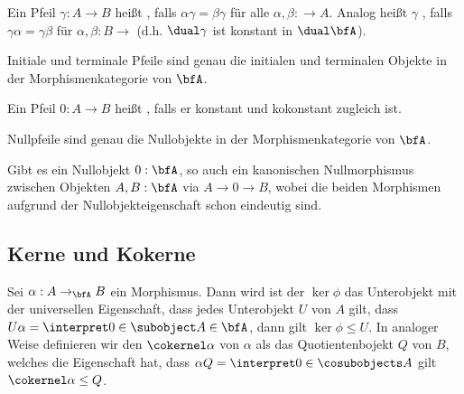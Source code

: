 \begin{definition}
    Ein Pfeil $\gamma:A\to B$ heißt , falls $\alpha\gamma=\beta\gamma$
    für alle $\alpha,\beta:\to A$. Analog heißt $\gamma$ , falls
    $\gamma\alpha=\gamma\beta$ für $\alpha,\beta:B\to$ (d.h. $\dual\gamma$ ist konstant in $\dual\bfA$).
\end{definition}

\begin{remark}
    Initiale und terminale Pfeile sind genau die initialen und terminalen Objekte in der Morphismenkategorie von $\bfA$. 
\end{remark}

\begin{definition}[Nullpfeil]
    Ein Pfeil $0:A\to B$ heißt , falls er konstant und kokonstant zugleich ist.
\end{definition}

\begin{remark}
    Nullpfeile sind genau die Nullobjekte in der Morphismenkategorie von $\bfA$.
\end{remark}

\begin{remark}
    Gibt es ein Nullobjekt $0:\bfA$, so auch ein kanonischen Nullmorphismus zwischen Objekten $A,B:\bfA$ via $A\to 0\to B$, wobei
    die beiden Morphismen aufgrund der Nullobjekteigenschaft schon eindeutig sind. 
\end{remark}

\subsection{Kerne und Kokerne}

\begin{definition}
Sei $\alpha:A\to_\bfA B$ ein Morphismus. Dann wird ist der  $\ker\phi$ das Unterobjekt mit der universellen Eigenschaft, dass jedes
Unterobjekt $U$ von $A$ gilt, dass $U\alpha=\interpret 0\in{\subobject A\in\bfA}$, dann gilt $\ker\phi\leq U$.
In analoger Weise definieren wir den  $\cokernel \alpha$ von $\alpha$ als das Quotientenbojekt $Q$ von $B$, welches die
Eigenschaft hat, dass $\alpha Q=\interpret 0\in{\cosubobjects A}$ gilt $\cokernel \alpha\leq Q$.
\end{definition}

